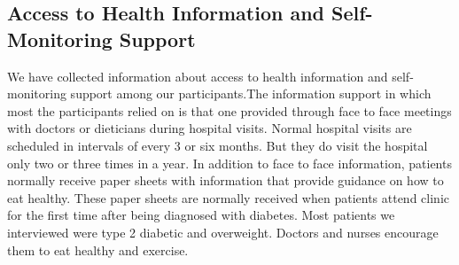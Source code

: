 \subsection{Access to Health Information and Self-Monitoring Support}
We have collected information about access to health information and self-monitoring support among our participants.The information support in which most the participants relied on is that one provided through face to face meetings with doctors or dieticians during hospital visits. Normal hospital visits are scheduled in intervals of every 3 or six months. But they do visit the hospital only two or three times in a year. In addition to face to face information, patients normally receive paper sheets with information that provide guidance on how to eat healthy. These paper sheets are normally received when patients attend clinic for the first time after being diagnosed with diabetes. Most patients we interviewed were type 2 diabetic and overweight. Doctors and nurses encourage them to eat healthy and exercise. 

